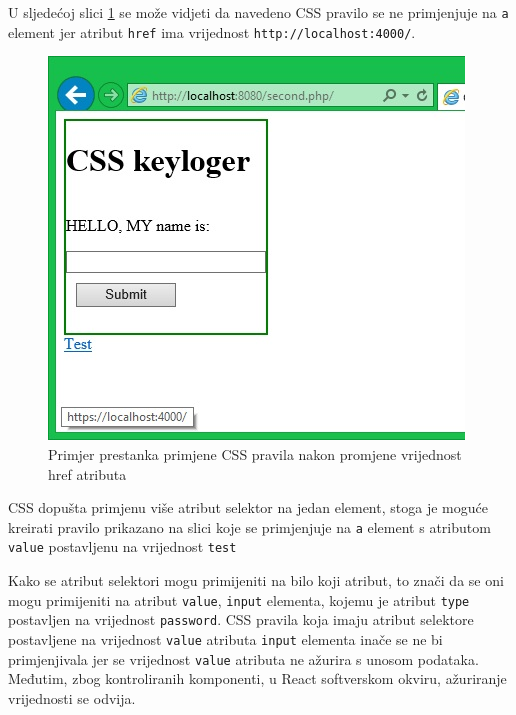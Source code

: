 \documentclass[12pt, oneside, onecolumn]{book}
\begin{document}
{U sljedećoj slici \ref{fig:css_ex2} se može vidjeti da navedeno CSS pravilo se ne primjenjuje na \texttt{a} element jer atribut \texttt{href} ima vrijednost \texttt{http://localhost:4000/}.

\begin{figure}[H]
	\begin{center}
		\includegraphics[width=\textwidth]{css_ex2.jpg}
		\caption{Primjer prestanka primjene CSS pravila nakon promjene vrijednost href atributa} \label{fig:css_ex2}
	\end{center}
\end{figure}

CSS dopušta primjenu više atribut selektor na jedan element, stoga je moguće kreirati pravilo prikazano na slici  koje se primjenjuje na \texttt{a} element s atributom \texttt{value} postavljenu na vrijednost \texttt{test} 

Kako se atribut selektori mogu primijeniti na bilo koji atribut, to znači da se oni mogu primijeniti na atribut \texttt{value}, \texttt{input} elementa, kojemu je atribut \texttt{type} postavljen na vrijednost \texttt{password}. CSS pravila koja imaju atribut selektore postavljene na vrijednost \texttt{value} atributa \texttt{input} elementa inače se ne bi primjenjivala jer se vrijednost \texttt{value} atributa ne ažurira s unosom podataka. Međutim, zbog kontroliranih komponenti, u React softverskom okviru, ažuriranje vrijednosti se odvija.

}
\end{document}
